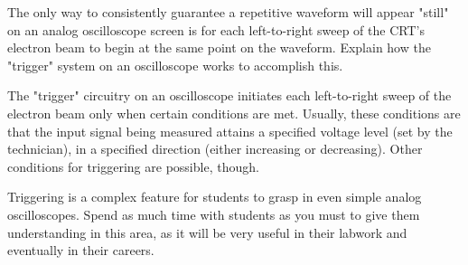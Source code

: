 

The only way to consistently guarantee a repetitive waveform will appear "still" on an analog oscilloscope screen is for each left-to-right sweep of the CRT's electron beam to begin at the same point on the waveform.  Explain how the "trigger" system on an oscilloscope works to accomplish this. 







The "trigger" circuitry on an oscilloscope initiates each left-to-right sweep of the electron beam only when certain conditions are met.  Usually, these conditions are that the input signal being measured attains a specified voltage level (set by the technician), in a specified direction (either increasing or decreasing).  Other conditions for triggering are possible, though.







Triggering is a complex feature for students to grasp in even simple analog oscilloscopes.  Spend as much time with students as you must to give them understanding in this area, as it will be very useful in their labwork and eventually in their careers.




